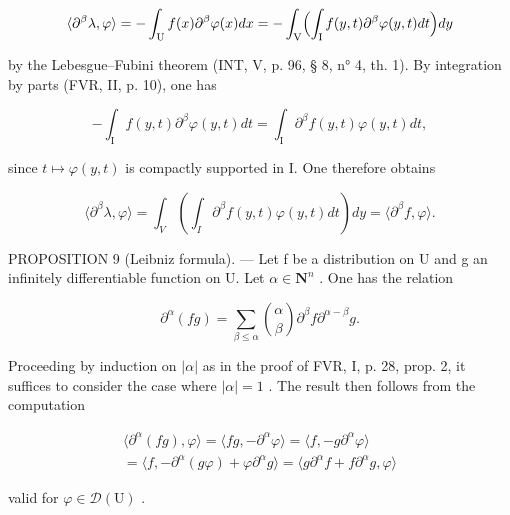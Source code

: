 \[
\langle \partial^ {\beta} \lambda , \varphi \rangle = - \int_ {\mathrm{U}} f (x) \partial^ {\beta} \varphi (x) d x = - \int_ {\mathrm{V}} \Bigl (\int_ {\mathrm{I}} f (y, t) \partial^ {\beta} \varphi (y, t) d t \Bigr) d y
\]

by the Lebesgue--Fubini theorem (INT, V, p. 96, § 8, n° 4, th. 1). By integration by parts (FVR, II, p. 10), one has

\[
- \int_ {\mathrm{I}} f (y, t) \partial^ {\beta} \varphi (y, t) d t = \int_ {\mathrm{I}} \partial^ {\beta} f (y, t) \varphi (y, t) d t,
\]

since \(t \mapsto \varphi(y, t)\) is compactly supported in I. One therefore obtains

\[
\langle \partial^ {\beta} \lambda , \varphi \rangle = \int_ {V} \left(\int_ {I} \partial^ {\beta} f (y, t) \varphi (y, t) d t\right) d y = \langle \partial^ {\beta} f, \varphi \rangle .
\]

PROPOSITION 9 (Leibniz formula). --- Let f be a distribution on U and g an infinitely differentiable function on U. Let \(\alpha \in \mathbf{N}^n\) . One has the relation

\[
\partial^ {\alpha} (f g) = \sum_ {\beta \leqslant \alpha} \binom {\alpha} {\beta} \partial^ {\beta} f   \partial^ {\alpha - \beta} g.
\]

Proceeding by induction on \(|\alpha|\) as in the proof of FVR, I, p. 28, prop. 2, it suffices to consider the case where \(|\alpha|=1\) . The result then follows from the computation

\[
\begin{array}{c} \langle \partial^ {\alpha} (f g), \varphi \rangle = \langle f g, - \partial^ {\alpha} \varphi \rangle = \langle f, - g \partial^ {\alpha} \varphi \rangle \\ = \langle f, - \partial^ {\alpha} (g \varphi) + \varphi \partial^ {\alpha} g \rangle = \langle g \partial^ {\alpha} f + f \partial^ {\alpha} g, \varphi \rangle \end{array}
\]

valid for \(\varphi\in\mathcal{D}(\mathrm{U})\) .

